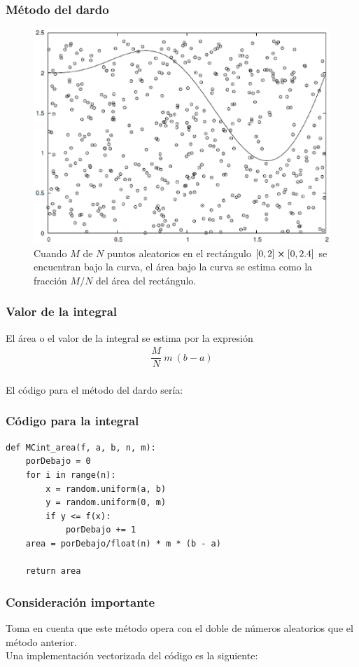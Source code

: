 \begin{frame}
\frametitle{Método del dardo}
\begin{figure}
	\centering
	\includegraphics[scale=0.4]{Imagenes/integracionCaja.eps}
	\caption{\tiny{Cuando $M$ de $N$ puntos aleatorios en el rectángulo $[0, 2] \cp [0, 2.4]$ se encuentran bajo la curva, el área bajo la curva se estima como la fracción $M / N$ del área del rectángulo.}}
\end{figure}
\end{frame}
\begin{frame}
\frametitle{Valor de la integral}
El área o el valor de la integral se estima por la expresión
\begin{align*}
\dfrac{M}{N} \: m \: (b - a)
\end{align*}
\\
\bigskip
\pause
El código para el método del dardo sería:
\end{frame}
\begin{frame}
\frametitle{Código para la integral}
\begin{lstlisting}[caption=Código para el método del dardo, style=codigopython]
def MCint_area(f, a, b, n, m):
    porDebajo = 0 
    for i in range(n):
        x = random.uniform(a, b)
        y = random.uniform(0, m)
        if y <= f(x):
            porDebajo += 1
    area = porDebajo/float(n) * m * (b - a)
    
    return area
\end{lstlisting}
\end{frame}
\begin{frame}[fragile]
\frametitle{Consideración importante}
Toma en cuenta que este método opera con el doble de números aleatorios que el método anterior.
\\
\bigskip
Una implementación vectorizada del código es la siguiente:
\end{frame}
